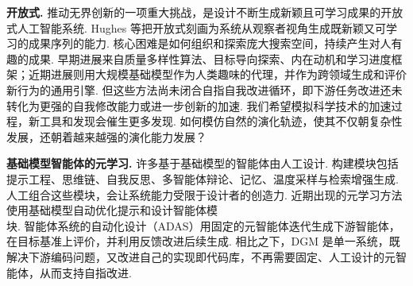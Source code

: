 \textbf{开放式.} 推动无界创新的一项重大挑战，是设计不断生成新颖且可学习成果的开放式人工智能系统\cite{dgm-stanley2017open}. Hughes 等\cite{dgm-hughes2024open}把开放式刻画为系统从观察者视角生成既新颖又可学习的成果序列的能力. 核心困难是如何组织和探索庞大搜索空间，持续产生对人有趣的成果\cite{dgm-clune2019ai,dgm-jiang2023general}. 早期进展来自质量多样性算法、目标导向探索、内在动机和学习进度框架\cite{dgm-pugh2016quality,dgm-ecoffet2019go,dgm-lehman2011novelty,dgm-oudeyer2007intrinsic}；近期进展则用大规模基础模型作为人类趣味的代理，并作为跨领域生成和评价新行为的通用引擎\cite{dgm-brown2020language,dgm-hu2025automated,dgm-zhang2024omni}. 但这些方法尚未闭合自指自我改进循环，即下游任务改进还未转化为更强的自我修改能力或进一步创新的加速. 我们希望模拟科学技术的加速过程，新工具和发现会催生更多发现. 如何模仿自然的演化轨迹，使其不仅朝复杂性发展，还朝着越来越强的演化能力发展\cite{dgm-dawkins2019evolution,dgm-gerhart2007theory,dgm-hendrikse2007evolvability}？

\textbf{基础模型智能体的元学习.} 许多基于基础模型的智能体由人工设计. 构建模块包括提示工程\cite{dgm-chen2023unleashing,dgm-schulhoff2024prompt}、思维链\cite{dgm-wei2022chain,dgm-yao2023react,dgm-hu2023ThoughtCloning,dgm-guo2025deepseek,dgm-lightman2023let,dgm-muennighoff2025s1,dgm-zelikman2024quiet}、自我反思\cite{dgm-shinn2023reflexion,dgm-yao2023react,dgm-madaan2303self}、多智能体辩论\cite{dgm-zhuge2023mindstorms,dgm-liang2023encouraging,dgm-khan2024debating}、记忆\cite{dgm-liu2023think,dgm-zhong2024memorybank,dgm-modarressi2023ret}、温度采样\cite{dgm-zhu2024hot}与检索增强生成\cite{dgm-lewis2020retrieval}. 人工组合这些模块，会让系统能力受限于设计者的创造力. 近期出现的元学习方法使用基础模型自动优化提示\cite{dgm-fernandopromptbreeder,dgm-meta2022human,dgm-khattab2023dspy,dgm-cheng2025trace,dgm-yuksekgonul2024textgrad,dgm-yuan2024evoagent}和设计智能体模块\cite{dgm-zhang2024aflow,dgm-zhou2024symbolic,dgm-yin2024g,dgm-zhugegptswarm,dgm-rosser2025agentbreeder,dgm-zhang2025multi,dgm-ye2025mas,dgm-gao2025flowreasoner,dgm-nie2025weak,dgm-su2025debflow,dgm-zhang2025gnns,dgm-niu2025flow}. 智能体系统的自动化设计（ADAS）\cite{dgm-hu2025automated}用固定的元智能体迭代生成下游智能体，在目标基准上评价，并利用反馈改进后续生成. 相比之下，DGM 是单一系统，既解决下游编码问题，又改进自己的实现即代码库，不再需要固定、人工设计的元智能体，从而支持自指改进.

